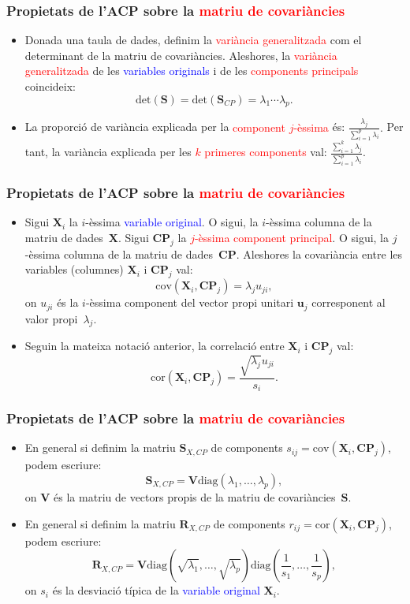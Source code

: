 \documentclass[12pt,t]{beamer}
\newcommand{\red}[1]{\textcolor{red}{#1}}
\newcommand{\blue}[1]{\textcolor{blue}{#1}}
\theoremstyle{plain}
\theoremstyle{definition}
\begin{document}
\begin{frame}
\frametitle{Propietats de l'ACP sobre la \red{matriu de covariàncies}}
{\small
\begin{itemize}
\item Donada una taula de dades, definim la \red{variància generalitzada} com el determinant de la matriu de 
covariàncies. Aleshores, la \red{variància generalitzada} de les \blue{variables originals} i de les \red{components 
principals} coincideix:
\[
\mbox{det}(\mathbf{S}) =\mbox{det}(\mathbf{S}_{CP}) =\lambda_1\cdots \lambda_p.
\]
\item La proporció de variància explicada per la \red{component $j$-èssima} és: 
$\frac{\lambda_j}{\sum_{i=1}^p\lambda_i}.$ Per tant, la variància explicada per les \red{$k$ primeres components} val: 
$\frac{\sum_{i=1}^k\lambda_j}{\sum_{i=1}^p\lambda_i}.$

\end{itemize}
}
\end{frame}


\begin{frame}
\frametitle{Propietats de l'ACP sobre la \red{matriu de covariàncies}}
{\small
\begin{itemize}
\item Sigui $\mathbf{X}_i$ la $i$-èssima \blue{variable original}. O sigui, la $i$-èssima columna de la matriu de 
dades~$\mathbf{X}$. Sigui $\mathbf{CP}_j$ la \red{$j$-èssima component principal}. O sigui, la $j$-èssima columna de la 
matriu de dades~$\mathbf{CP}$. Aleshores la covariància entre les variables (columnes) $\mathbf{X}_i$ i $\mathbf{CP}_j$ 
val:
\[
\mbox{cov}(\mathbf{X}_i,\mathbf{CP}_j)=\lambda_j u_{ji},
\]
on $u_{ji}$ és la $i$-èssima component del vector propi unitari $\mathbf{u}_j$ corresponent al valor propi~$\lambda_j.$ 

\item Seguin la mateixa notació anterior, la correlació entre $\mathbf{X}_i$ i $\mathbf{CP}_j$ val:
\[
\mbox{cor}(\mathbf{X}_i,\mathbf{CP}_j)=\frac{\sqrt{\lambda_j}u_{ji}}{s_i}.
\]
\end{itemize}
}
\end{frame}

\begin{frame}
\frametitle{Propietats de l'ACP sobre la \red{matriu de covariàncies}}
\begin{itemize}
\item En general si definim la matriu $\mathbf{S}_{X,CP}$ de components $s_{ij}=\mbox{cov}(\mathbf{X}_i,\mathbf{CP}_j)$, 
podem escriure:
\[
\mathbf{S}_{X,CP}= \mathbf{V}\mbox{diag}(\lambda_1,\ldots,\lambda_p),
\]
on $\mathbf{V}$ és la matriu de vectors propis de la matriu de covariàncies~$\mathbf{S}.$
\item En general si definim la matriu $\mathbf{R}_{X,CP}$ de components $r_{ij}=\mbox{cor}(\mathbf{X}_i,\mathbf{CP}_j)$, 
podem escriure:
\[
\mathbf{R}_{X,CP}= 
\mathbf{V}\mbox{diag}(\sqrt{\lambda_1},\ldots,\sqrt{\lambda_p})\mbox{diag}\left(\frac{1}{s_1},\ldots,\frac{1}{s_p}
\right),
\]
on $s_i$ és la desviació típica de la \blue{variable original} $\mathbf{X}_i$.
\end{itemize}
\end{frame}
\end{document}

